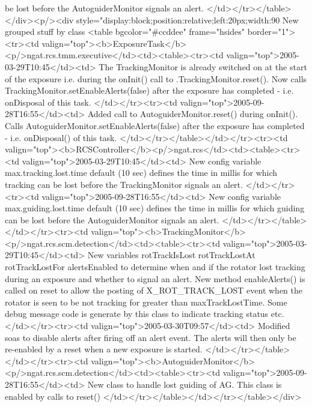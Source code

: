 	    be lost before the AutoguiderMonitor signals an alert. 
	  </td></tr></table></div><p/><div style="display:block;position:relative;left:20px;width:90%
     New grouped stuff by class
     <table bgcolor="#ccddee" frame="hsides" border="1"><tr><td valign="top"><b>ExposureTask</b><p/>ngat.rcs.tmm.executive</td><td><table><tr><td valign="top">2005-03-29T10:45</td><td> 
	  The TrackingMonitor is already switched on at the start of the exposure i.e. during the onInit() call
	  to .TrackingMonitor.reset().
	  Now calls TrackingMonitor.setEnableAlerts(false) after the exposure has completed - i.e. onDisposal
	  of this task.
	</td></tr><tr><td valign="top">2005-09-28T16:55</td><td> 
	    Added call to AutoguiderMonitor.reset() during onInit().
	    Calls AutoguiderMonitor.setEnableAlerts(false) after the exposure has completed - 
	    i.e. onDisposal() of this task.
	  </td></tr></table></td></tr><tr><td valign="top"><b>RCSController</b><p/>ngat.rcs</td><td><table><tr><td valign="top">2005-03-29T10:45</td><td> 
	  New config variable max.tracking.lost.time default (10 sec) defines the time in millis for which tracking can 
	  be lost before the TrackingMonitor signals an alert. 
	</td></tr><tr><td valign="top">2005-09-28T16:55</td><td> 
	    New config variable max.guiding.lost.time default (10 sec) defines the time in millis for which guiding can 
	    be lost before the AutoguiderMonitor signals an alert. 
	  </td></tr></table></td></tr><tr><td valign="top"><b>TrackingMonitor</b><p/>ngat.rcs.scm.detection</td><td><table><tr><td valign="top">2005-03-29T10:45</td><td> 
	  New variables rotTrackIsLost rotTrackLostAt rotTrackLostFor alertsEnabled to determine when and
	  if the rotator lost tracking during an exposure and whether to signal an alert. 
	  New method enableAlerts() is called on reset to allow the posting of X_ROT_TRACK_LOST event
	  when the rotator is seen to be not tracking for greater than maxTrackLostTime. 
	  Some debug message code is generate by this class to indicate tracking status etc.
	</td></tr><tr><td valign="top">2005-03-30T09:57</td><td> 
	    Modified soas to disable alerts after firing off an alert event. The alerts will then only be re-enabled
	    by a reset when a new exposure is started.
	  </td></tr></table></td></tr><tr><td valign="top"><b>AutoguiderMonitor</b><p/>ngat.rcs.scm.detection</td><td><table><tr><td valign="top">2005-09-28T16:55</td><td> 
	    New class to handle lost guiding of AG. This class is enabled by calls to reset()
	  </td></tr></table></td></tr></table></div>

